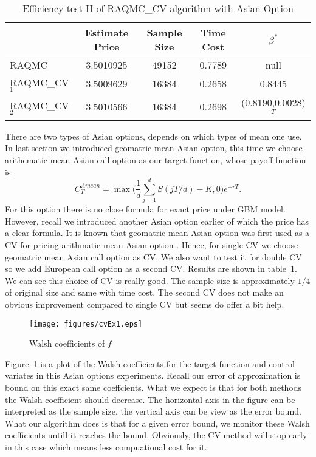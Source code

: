 \begin{table}[h]
    \centering
	\caption{Efficiency test II of RAQMC\_CV algorithm with Asian Option}
    \label{tb:efftest2a}
    \begin{tabular}{lcccc}  
    \hline\hline
    &Estimate Price&Sample Size&Time Cost&$\beta^*$\\[0.5ex]
    \hline
    RAQMC& 3.5010925& 49152 & 0.7789 & null\\[1ex]
    RAQMC\_CV$_1$&3.5009629& 16384 & 0.2658& 0.8445 \\[1ex]
    RAQMC\_CV$_2$&3.5010566& 16384 & 0.2698&(0.8190,0.0028)$^T$\\[1ex]
    \hline
	\end{tabular}
\end{table}
There are two types of Asian options, depends on which types of mean one use. 
In last section we introduced geomatric mean Asian option, this time we choose arithematic mean Asian call option as our target function, whose payoff function is:
\[ C_{T}^{Amean} = \max\Big(\frac{1}{d}\sum_{j=1}^{d}S(jT/d)-K, 0\Big)e^{-rT}.\]
For this option there is no close formula for exact price under GBM model.
However, recall we introduced another Asian option earlier of which the price has a clear formula. 
It is known that geomatric mean Asian option was first used as a CV for pricing arithmatic mean Asian option \cite{kemna1990pricing}. 
Hence, for single CV we choose geomatric mean Asian call option as CV. 
We also want to test it for double CV so we add European call option as a second CV. 
Results are shown in table~\ref{tb:efftest2a}. We can see this choice of CV is really good. 
The sample size is approximately $1/4$ of original size and same with time cost. 
The second CV does not make an obvious improvement compared to single CV but seems do offer a bit help.    

\begin{figure}[h]
    \centering
    \setlength{\unitlength}{0.14in}     %
    \texttt{[image: figures/cvEx1.eps]}
    \caption{Walsh coefficients of $f$}
    \label{fg:cvEX1}
\end{figure}

Figure~\ref{fg:cvEX1} is a plot of the Walsh coefficients for the target function and control variates in this Asian options experiments. Recall our error of approximation is bound on this exact same coeffcients. 
What we expect is that for both methods the Walsh coefficient should decrease.   
The horizontal axis in the figure can be interpreted as the sample size, the vertical axis can be view as the error bound. 
What our algorithm does is that for a given error bound, we monitor these Walsh coefficients untill it reaches the bound. Obviously, the CV method will stop early in this case which means less compuational cost for it. 

